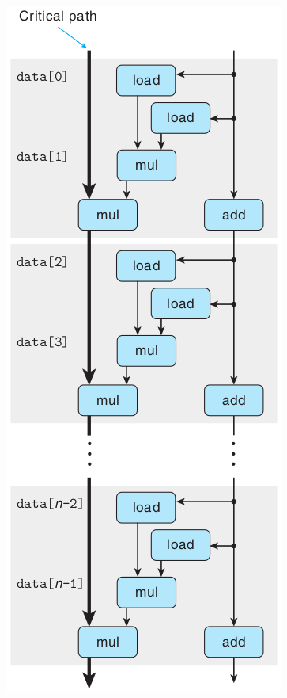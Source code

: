 \begin{figure}[!ht]
\begin{minipage}{0.33\textwidth}
        \includegraphics[width=\textwidth]{img/5-13}
    \end{minipage}
\end{figure}

